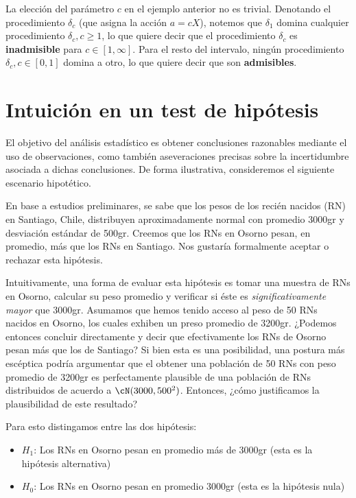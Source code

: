 \begin{remark}
    La elección del parámetro $c$ en el ejemplo anterior no es trivial. Denotando el procedimiento $\delta_c$ (que asigna la acción $a=cX$), notemos que $\delta_1$ domina cualquier procedimiento $\delta_c,c\geq 1$, lo que quiere decir que el procedimiento $\delta_c$ es \textbf{inadmisible} para $c\in[1,\infty]$. Para el resto del intervalo, ningún procedimiento  $\delta_c,c\in [0,1]$ domina a otro, lo que quiere decir que son   \textbf{admisibles}.   
\end{remark}

\section{Intuición en un test de hipótesis} 
\label{sec:int_hipótesis}

El objetivo del análisis estadístico es obtener conclusiones razonables mediante el uso de observaciones, como también aseveraciones precisas sobre la incertidumbre asociada a dichas conclusiones. De forma ilustrativa, consideremos el siguiente escenario hipotético.

En base a estudios preliminares, se sabe que los pesos de los recién nacidos (RN) en Santiago, Chile, distribuyen aproximadamente normal con promedio 3000gr y desviación estándar de 500gr. Creemos que los RNs en Osorno pesan, en promedio, más que los RNs en Santiago. Nos gustaría formalmente aceptar o rechazar esta hipótesis. 

Intuitivamente, una forma de evaluar esta hipótesis es tomar una muestra de RNs en Osorno, calcular su peso promedio y verificar si éste es \textit{significativamente mayor} que 3000gr. Asumamos que hemos tenido acceso al peso de 50 RNs nacidos en Osorno, los cuales exhiben un preso promedio de 3200gr. ¿Podemos entonces concluir directamente y decir que efectivamente los RNs de Osorno pesan más que los de Santiago?  Si bien esta es una posibilidad, una postura más escéptica podría argumentar que el obtener una población de 50 RNs con peso promedio de 3200gr es perfectamente plausible de una población de RNs distribuidos de acuerdo a $\cN(3000,500^2)$. Entonces, ¿cómo justificamos la plausibilidad de este resultado?

Para esto distingamos entre las dos hipótesis: 

\begin{itemize}
	\item $H_1$: Los RNs en Osorno pesan en promedio más de 3000gr (esta es la hipótesis alternativa)
	\item $H_0$: Los RNs en Osorno pesan en promedio 3000gr (esta es la hipótesis nula)
\end{itemize}


